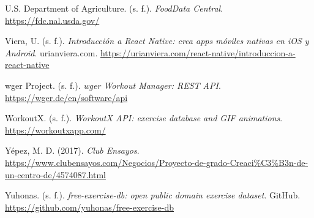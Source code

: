 \begin{referenciasapa}
\item U.S. Department of Agriculture. (s. f.). \textit{FoodData Central}. \url{https://fdc.nal.usda.gov/}

\item Viera, U. (s. f.). \textit{Introducción a React Native: crea apps móviles nativas en iOS y Android}. urianviera.com. \url{https://urianviera.com/react-native/introduccion-a-react-native}

\item wger Project. (s. f.). \textit{wger Workout Manager: REST API}. \url{https://wger.de/en/software/api}

\item WorkoutX. (s. f.). \textit{WorkoutX API: exercise database and GIF animations}. \url{https://workoutxapp.com/}

\item Yépez, M. D. (2017). \textit{Club Ensayos}. \url{https://www.clubensayos.com/Negocios/Proyecto-de-grado-Creaci\%C3\%B3n-de-un-centro-de/4574087.html}

\item Yuhonas. (s. f.). \textit{free-exercise-db: open public domain exercise dataset}. GitHub. \url{https://github.com/yuhonas/free-exercise-db}


\end{referenciasapa}
